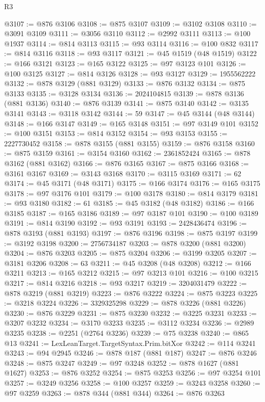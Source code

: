 \begin{lexlean}{R3}
\begin{coremodule}
@3107 := @876 @3106
@3108 := @875 @3107
@3109 := @3102 @3108
@3110 := @3091 @3109
@3111 := @3056 @3110
@3112 := @2992 @3111
@3113 := @100 @1937
@3114 := @814 @3113
@3115 := @93 @3114
@3116 := @100 @832
@3117 := @814 @3116
@3118 := @93 @3117
@3121 := @45 @1519 (@48 @1519)
@3122 := @166 @3121
@3123 := @165 @3122
@3125 := @97 @3123 @101
@3126 := @100 @3125
@3127 := @814 @3126
@3128 := @93 @3127
@3129 := 1955562222
@3132 := @878 @3129 (@881 @3129)
@3133 := @876 @3132
@3134 := @875 @3133
@3135 := @3128 @3134
@3136 := 2024104815
@3139 := @878 @3136 (@881 @3136)
@3140 := @876 @3139
@3141 := @875 @3140
@3142 := @3135 @3141
@3143 := @3118 @3142
@3144 := 59
@3147 := @45 @3144 (@48 @3144)
@3148 := @166 @3147
@3149 := @165 @3148
@3151 := @97 @3149 @101
@3152 := @100 @3151
@3153 := @814 @3152
@3154 := @93 @3153
@3155 := 2227730452
@3158 := @878 @3155 (@881 @3155)
@3159 := @876 @3158
@3160 := @875 @3159
@3161 := @3154 @3160
@3162 := 2361852424
@3165 := @878 @3162 (@881 @3162)
@3166 := @876 @3165
@3167 := @875 @3166
@3168 := @3161 @3167
@3169 := @3143 @3168
@3170 := @3115 @3169
@3171 := 62
@3174 := @45 @3171 (@48 @3171)
@3175 := @166 @3174
@3176 := @165 @3175
@3178 := @97 @3176 @101
@3179 := @100 @3178
@3180 := @814 @3179
@3181 := @93 @3180
@3182 := 61
@3185 := @45 @3182 (@48 @3182)
@3186 := @166 @3185
@3187 := @165 @3186
@3189 := @97 @3187 @101
@3190 := @100 @3189
@3191 := @814 @3190
@3192 := @93 @3191
@3193 := 2428436474
@3196 := @878 @3193 (@881 @3193)
@3197 := @876 @3196
@3198 := @875 @3197
@3199 := @3192 @3198
@3200 := 2756734187
@3203 := @878 @3200 (@881 @3200)
@3204 := @876 @3203
@3205 := @875 @3204
@3206 := @3199 @3205
@3207 := @3181 @3206
@3208 := 63
@3211 := @45 @3208 (@48 @3208)
@3212 := @166 @3211
@3213 := @165 @3212
@3215 := @97 @3213 @101
@3216 := @100 @3215
@3217 := @814 @3216
@3218 := @93 @3217
@3219 := 3204031479
@3222 := @878 @3219 (@881 @3219)
@3223 := @876 @3222
@3224 := @875 @3223
@3225 := @3218 @3224
@3226 := 3329325298
@3229 := @878 @3226 (@881 @3226)
@3230 := @876 @3229
@3231 := @875 @3230
@3232 := @3225 @3231
@3233 := @3207 @3232
@3234 := @3170 @3233
@3235 := @3112 @3234
@3236 := @2989 @3235
@3238 := @2251 (@2764 @3236)
@3239 := @75 @3238
@3240 := @865 @13
@3241 := LexLeanTarget.TargetSyntax.Prim.bitXor
@3242 := @114 @3241
@3243 := @94 @2945
@3246 := @878 @187 (@881 @187)
@3247 := @876 @3246
@3248 := @875 @3247
@3249 := @97 @3248
@3252 := @878 @1627 (@881 @1627)
@3253 := @876 @3252
@3254 := @875 @3253
@3256 := @97 @3254 @101
@3257 := @3249 @3256
@3258 := @100 @3257
@3259 := @3243 @3258
@3260 := @97 @3259
@3263 := @878 @344 (@881 @344)
@3264 := @876 @3263

\end{coremodule}
\end{lexlean}
